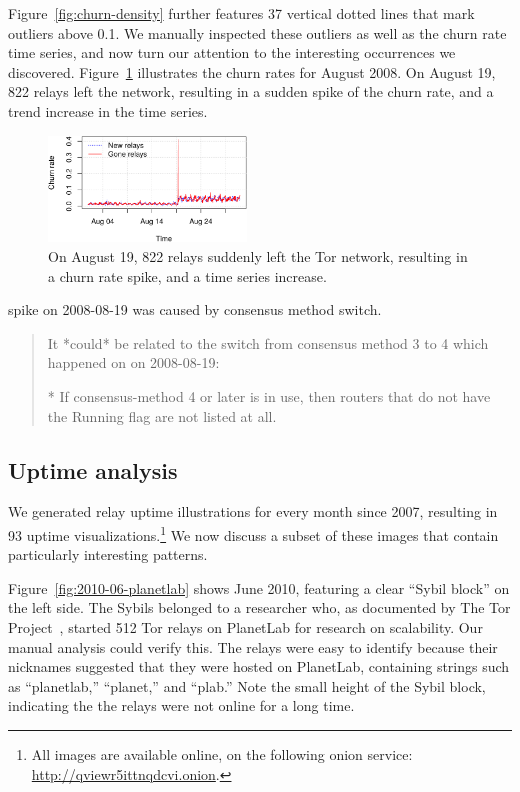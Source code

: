 Figure~\ref{fig:churn-density} further features 37 vertical dotted lines that
mark outliers above 0.1.  We manually inspected these outliers as well as the
churn rate time series, and now turn our attention to the interesting
occurrences we discovered.  Figure~\ref{fig:2008-08} illustrates the churn rates
for August 2008.  On August 19, 822 relays left the network, resulting in a
sudden spike of the churn rate, and a trend increase in the time series.

\begin{figure}[t]
	\centering
	\includegraphics[width=0.47\textwidth]{diagrams/2008-08.pdf}
	\caption{On August 19, 822 relays suddenly left the Tor network, resulting
	in a churn rate spike, and a time series increase.}
	\label{fig:2008-08}
\end{figure}

spike on 2008-08-19 was caused by consensus method switch.
\begin{quote}
It *could* be related to the switch from consensus method 3 to 4 which happened
on on 2008-08-19:

        * If consensus-method 4 or later is in use, then routers that
          do not have the Running flag are not listed at all.
\end{quote}

\subsection{Uptime analysis}
\label{sec:uptime}
We generated relay uptime illustrations for every month since 2007, resulting in
93 uptime visualizations.\footnote{All images are available online, on the following
onion service: \url{http://qviewr5ittnqdcvi.onion}.}
We now discuss a subset of these images that
contain particularly interesting patterns.

Figure~\ref{fig:2010-06-planetlab} shows June 2010, featuring a clear ``Sybil
block'' on the left side.  The Sybils belonged to a researcher who, as
documented by The Tor Project~\cite{progressreport}, started 512 Tor relays on
PlanetLab for research on scalability.  Our manual analysis could verify this.
The relays were easy to identify because their nicknames suggested that they
were hosted on PlanetLab, containing strings such as ``planetlab,'' ``planet,''
and ``plab.''  Note the small height of the Sybil block, indicating the the
relays were not online for a long time.

